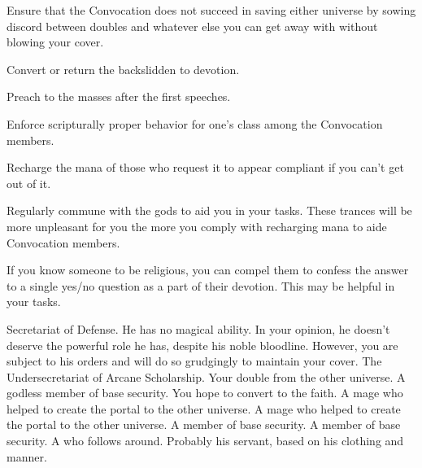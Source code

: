 \documentclass[char]{guildcamp3}
\begin{document}
\begin{itemz}[Goals]
  \item Ensure that the Convocation does not succeed in saving either universe by sowing discord between doubles and whatever else you can get away with without blowing your cover.
  \item Convert or return the backslidden to devotion.
  \item Preach to the masses after the first speeches.
  \item Enforce scripturally proper behavior for one's class among the Convocation members.
  \item Recharge the mana of those who request it to appear compliant if you can't get out of it.
  \item Regularly commune with the gods to aid you in your tasks. These trances will be more unpleasant for you the more you comply with recharging mana to aide Convocation members.
\end{itemz}

\begin{itemz}[Notes]
  \item If you know someone to be religious, you can compel them to confess the answer to a single yes/no question as a part of their devotion. This may be helpful in your tasks.
\end{itemz}


\begin{contacts}
  \contact{\cNobleOne{}} Secretariat of Defense. He has no magical ability. In your opinion, he doesn't deserve the powerful role he has, despite his noble bloodline. However, you are subject to his orders and will do so grudgingly to maintain your cover.
  \contact{\cNobleTwo{}} The Undersecretariat of Arcane Scholarship. 
  \contact{\cSpecOpTwo{}} Your double from the other universe. A godless member of base security. You hope to convert \cSpecOpTwo{\them} to the faith.
  \contact{\cMageOne{}} A mage who helped to create the portal to the other universe.
  \contact{\cMageTwo{}} A mage who helped to create the portal to the other universe. 
  \contact{\cRogueOne{}} A member of base security.
  \contact{\cRogueTwo{}} A member of base security.
  \contact{\cServant{}} A \cServant{\gender} who follows \cNobleOne{} around. Probably his servant, based on his clothing and manner.
\end{contacts}
\end{document}
